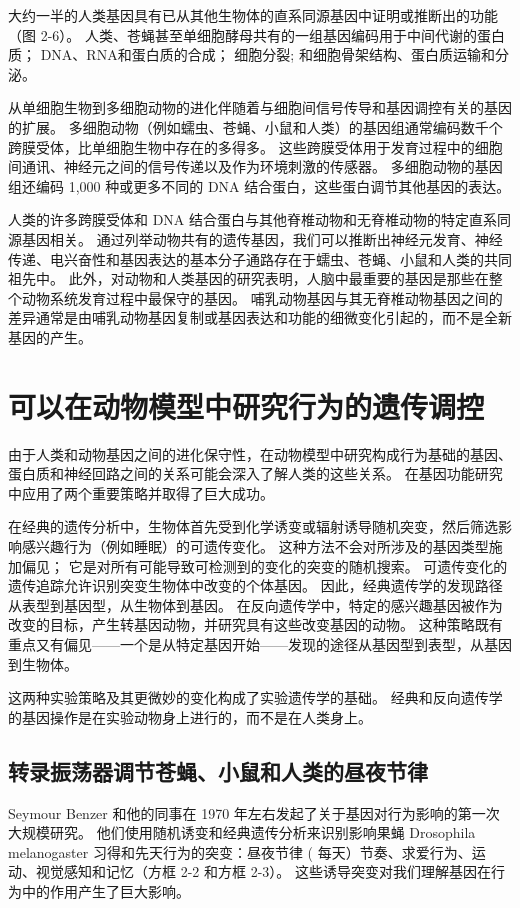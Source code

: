 大约一半的人类基因具有已从其他生物体的直系同源基因中证明或推断出的功能（图 2-6）。 
人类、苍蝇甚至单细胞酵母共有的一组基因编码用于中间代谢的蛋白质； 
DNA、RNA和蛋白质的合成； 
细胞分裂; 和细胞骨架结构、蛋白质运输和分泌。


从单细胞生物到多细胞动物的进化伴随着与细胞间信号传导和基因调控有关的基因的扩展。 
多细胞动物（例如蠕虫、苍蝇、小鼠和人类）的基因组通常编码数千个跨膜受体，比单细胞生物中存在的多得多。 
这些跨膜受体用于发育过程中的细胞间通讯、神经元之间的信号传递以及作为环境刺激的传感器。 
多细胞动物的基因组还编码 1,000 种或更多不同的 DNA 结合蛋白，这些蛋白调节其他基因的表达。


人类的许多跨膜受体和 DNA 结合蛋白与其他脊椎动物和无脊椎动物的特定直系同源基因相关。 
通过列举动物共有的遗传基因，我们可以推断出神经元发育、神经传递、电兴奋性和基因表达的基本分子通路存在于蠕虫、苍蝇、小鼠和人类的共同祖先中。 
此外，对动物和人类基因的研究表明，人脑中最重要的基因是那些在整个动物系统发育过程中最保守的基因。 
哺乳动物基因与其无脊椎动物基因之间的差异通常是由哺乳动物基因复制或基因表达和功能的细微变化引起的，而不是全新基因的产生。


\section{可以在动物模型中研究行为的遗传调控}
由于人类和动物基因之间的进化保守性，在动物模型中研究构成行为基础的基因、蛋白质和神经回路之间的关系可能会深入了解人类的这些关系。 
在基因功能研究中应用了两个重要策略并取得了巨大成功。


在经典的遗传分析中，生物体首先受到化学诱变或辐射诱导随机突变，然后筛选影响感兴趣行为（例如睡眠）的可遗传变化。 
这种方法不会对所涉及的基因类型施加偏见； 
它是对所有可能导致可检测到的变化的突变的随机搜索。 
可遗传变化的遗传追踪允许识别突变生物体中改变的个体基因。 
因此，经典遗传学的发现路径从表型到基因型，从生物体到基因。 
在反向遗传学中，特定的感兴趣基因被作为改变的目标，产生转基因动物，并研究具有这些改变基因的动物。 
这种策略既有重点又有偏见——一个是从特定基因开始——发现的途径从基因型到表型，从基因到生物体。


这两种实验策略及其更微妙的变化构成了实验遗传学的基础。 
经典和反向遗传学的基因操作是在实验动物身上进行的，而不是在人类身上。


\subsection{转录振荡器调节苍蝇、小鼠和人类的昼夜节律}
Seymour Benzer 和他的同事在 1970 年左右发起了关于基因对行为影响的第一次大规模研究。
他们使用随机诱变和经典遗传分析来识别影响果蝇 Drosophila melanogaster 习得和先天行为的突变：昼夜节律 ( 每天）节奏、求爱行为、运动、视觉感知和记忆（方框 2-2 和方框 2-3）。 
这些诱导突变对我们理解基因在行为中的作用产生了巨大影响。


